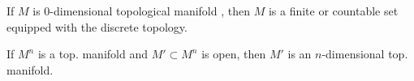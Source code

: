 \documentclass[12pt]{scrartcl}
\begin{document}
\begin{exercise} If $M$ is $0$-dimensional topological manifold , then $M$ is a finite or countable set equipped with the discrete topology.  
\end{exercise}
\begin{exercise} If $M^n$ is a top. manifold and $M' \subset M^n$ is open, then $M'$ is an $n$-dimensional top. manifold.  
\end{exercise}
\end{document}
